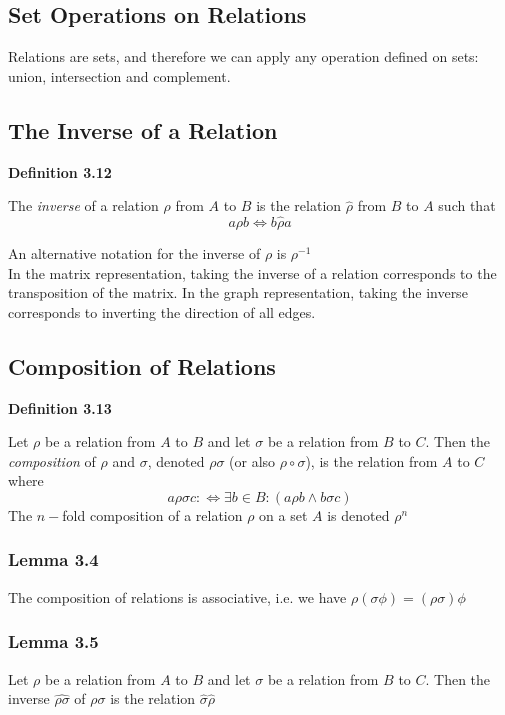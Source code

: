 \documentclass[a4paper]{report}
\newenvironment{definition}[1]{\begin{framed}\centerline{\textbf{Definition #1}}\noindent\hspace{-1.1mm}}{\end{framed}}
\begin{document}
\subsection{Set Operations on Relations}
Relations are sets, and therefore we can apply any operation defined on sets: union, intersection and complement. 

\subsection{The Inverse of a Relation}
\begin{definition}{3.12}
The \emph{inverse} of a relation $\rho$ from $A$ to $B$ is the relation $\widehat{\rho}$ from $B$ to $A$ such that \[a\rho b\Longleftrightarrow b\widehat{\rho} a\]
\end{definition}
An alternative notation for the inverse of $\rho$ is $\rho^{-1}$\\

In the matrix representation, taking the inverse of a relation corresponds to the transposition of the matrix. In the graph representation, taking the inverse corresponds to inverting the direction of all edges.

\subsection{Composition of Relations}
\begin{definition}{3.13}
Let $\rho$ be a relation from $A$ to $B$ and let $\sigma$ be a relation from $B$ to $C$. Then the \emph{composition} of $\rho$ and $\sigma$, denoted $\rho\sigma$ (or also $\rho\circ\sigma$), is the relation from $A$ to $C$ where \[a\rho\sigma c:\Longleftrightarrow\exists b\in B:(a\rho b\land b\sigma c)\]
The $n-$fold composition of a relation $\rho$ on a set $A$ is denoted $\rho^n$
\end{definition}

\subsubsection*{Lemma 3.4}
The composition of relations is associative, i.e. we have $\rho(\sigma\phi)=(\rho\sigma)\phi$

\subsubsection*{Lemma 3.5}
Let $\rho$ be a relation from $A$ to $B$ and let $\sigma$ be a relation from $B$ to $C$. Then the inverse $\widehat{\rho\sigma}$ of $\rho\sigma$ is the relation $\widehat{\sigma}\widehat{\rho}$
\end{document}
